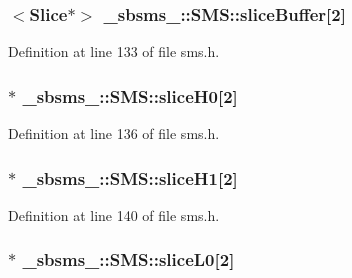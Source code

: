 \subsubsection[{\texorpdfstring{slice\+Buffer}{sliceBuffer}}]{$<${\bf Slice}$\ast$$>$ \+\_\+sbsms\+\_\+\+::\+S\+M\+S\+::slice\+Buffer\mbox{[}2\mbox{]}\hspace{0.3cm}{\ttfamily [protected]}}\hypertarget{class__sbsms___1_1_s_m_s_acc7122b5c39e60aef013ba910499f5d1}{}\label{class__sbsms___1_1_s_m_s_acc7122b5c39e60aef013ba910499f5d1}


Definition at line 133 of file sms.\+h.

\subsubsection[{\texorpdfstring{slice\+H0}{sliceH0}}]{$\ast$ \+\_\+sbsms\+\_\+\+::\+S\+M\+S\+::slice\+H0\mbox{[}2\mbox{]}\hspace{0.3cm}{\ttfamily [protected]}}\hypertarget{class__sbsms___1_1_s_m_s_ae6343140f71bce6818937b85e48b6d5c}{}\label{class__sbsms___1_1_s_m_s_ae6343140f71bce6818937b85e48b6d5c}


Definition at line 136 of file sms.\+h.

\subsubsection[{\texorpdfstring{slice\+H1}{sliceH1}}]{$\ast$ \+\_\+sbsms\+\_\+\+::\+S\+M\+S\+::slice\+H1\mbox{[}2\mbox{]}\hspace{0.3cm}{\ttfamily [protected]}}\hypertarget{class__sbsms___1_1_s_m_s_af1533a98629176f55867a0947ea89552}{}\label{class__sbsms___1_1_s_m_s_af1533a98629176f55867a0947ea89552}


Definition at line 140 of file sms.\+h.

\subsubsection[{\texorpdfstring{slice\+L0}{sliceL0}}]{$\ast$ \+\_\+sbsms\+\_\+\+::\+S\+M\+S\+::slice\+L0\mbox{[}2\mbox{]}\hspace{0.3cm}{\ttfamily [protected]}}\hypertarget{class__sbsms___1_1_s_m_s_adaf0a873bd30f2b760005dcd92bead87}{}\label{class__sbsms___1_1_s_m_s_adaf0a873bd30f2b760005dcd92bead87}


